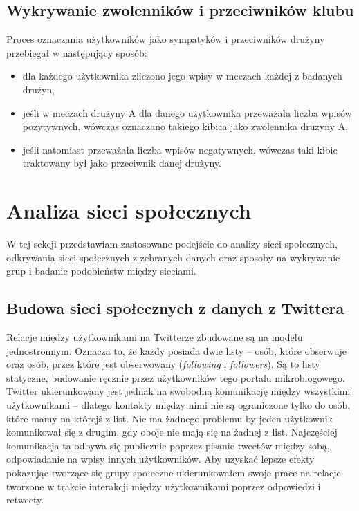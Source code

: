 \subsection{Wykrywanie zwolenników i przeciwników klubu}
\label{subsection:wykrywanie-zwolennikow}
Proces oznaczania użytkowników jako sympatyków i przeciwników drużyny przebiegał
w następujący sposób:
\begin{itemize}
  \item dla każdego użytkownika zliczono jego wpisy w meczach każdej z badanych 
  drużyn,
  \item jeśli w meczach drużyny A dla danego użytkownika przeważała liczba 
  wpisów pozytywnych, wówczas oznaczano takiego kibica jako zwolennika drużyny A,
  \item jeśli natomiast przeważała liczba wpisów negatywnych, wówczas taki kibic
  traktowany był jako przeciwnik danej drużyny.  
\end{itemize} 





\clearpage
\section{Analiza sieci społecznych}
\label{section:siecispoleczne}
W tej sekcji przedstawiam zastosowane podejście do analizy sieci społecznych,
odkrywania sieci społecznych z zebranych danych oraz sposoby na wykrywanie grup
i badanie podobieństw między sieciami.
\subsection{Budowa sieci społecznych z danych z Twittera}
Relacje między użytkownikami na Twitterze zbudowane są na modelu jednostronnym.
Oznacza to, że każdy posiada dwie listy -- osób, które obserwuje oraz osób,
przez które jest obserwowany (\textit{following} i \textit{followers}).
Są to listy statyczne, budowanie ręcznie przez użytkowników tego portalu
mikroblogowego. Twitter ukierunkowany jest jednak na swobodną komunikację między
wszystkimi użytkownikami -- dlatego kontakty między nimi nie są ograniczone
tylko do osób, które mamy na którejś z list. Nie ma żadnego problemu by jeden
użytkownik komunikował się z drugim, gdy oboje nie mają się na żadnej z list.
Najczęściej komunikacja ta odbywa się publicznie poprzez pisanie tweetów między
sobą, odpowiadanie na wpisy innych użytkowników. Aby uzyskać lepsze efekty
pokazując tworzące się grupy społeczne ukierunkowałem swoje prace na relacje
tworzone w trakcie interakcji między użytkownikami poprzez odpowiedzi i
retweety.


